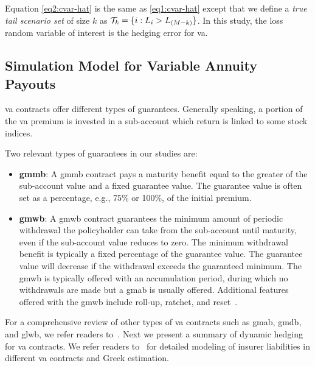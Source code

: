 Equation \eqref{eq2:cvar-hat} is the same as \eqref{eq1:cvar-hat} except that we define a \textit{true tail scenario set} of size $k$ as $\mathcal{T}_{k} = \{i: L_i > L_{(M-k)}\}$.
In this study, the loss random variable of interest is the hedging error for \gls{va}.

\subsection{Simulation Model for Variable Annuity Payouts}\label{subsec:VApayout}

\gls{va} contracts offer different types of guarantees.
Generally speaking, a portion of the \gls{va} premium is invested in a sub-account which return is linked to some stock indices.

Two relevant types of guarantees in our studies are:
\begin{itemize}[noitemsep]
    \item \textbf{\gls{gmmb}}: A \gls{gmmb} contract pays a maturity benefit equal to the greater of the sub-account value and a fixed guarantee value.
    The guarantee value is often set as a percentage, e.g., 75\% or 100\%, of the initial premium.

    \item \textbf{\gls{gmwb}}: A \gls{gmwb} contract guarantees the minimum amount of periodic withdrawal the policyholder can take from the sub-account until maturity, even if the sub-account value reduces to zero.
    The minimum withdrawal benefit is typically a fixed percentage of the guarantee value.
    The guarantee value will decrease if the withdrawal exceeds the guaranteed minimum. The \gls{gmwb} is typically offered with an accumulation period, during which no withdrawals are made but a \gls{gmab} is usually offered. Additional features offered with the \gls{gmwb} include roll-up, ratchet, and reset~\citep{geneva2013variable}.
\end{itemize}
For a comprehensive review of other types of \gls{va} contracts such as \gls{gmab}, \gls{gmdb}, and \gls{glwb}, we refer readers to~\cite{hardy2003investment}.
Next we present a summary of dynamic hedging for \gls{va} contracts.
We refer readers to~\cite{dang2021efficient} for detailed modeling of insurer liabilities in different \gls{va} contracts and Greek estimation.

